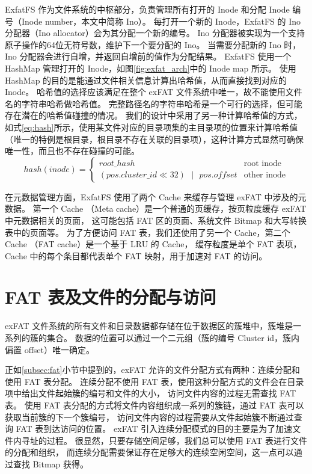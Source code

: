 ExfatFS 作为文件系统的中枢部分，负责管理所有打开的 Inode 和分配 Inode 编号（Inode number，本文中简称 Ino）。
每打开一个新的 Inode，ExfatFS 的 Ino 分配器（Ino allocator）会为其分配一个新的编号。
Ino 分配器被实现为一个支持原子操作的64位无符号数，维护下一个要分配的 Ino。
当需要分配新的 Ino 时，Ino 分配器会进行自增，并返回自增前的值作为分配结果。
ExfatFS 使用一个 HashMap 管理打开的 Inode，如图\ref{fig:exfat_arch}中的 Inode map 所示。
使用 HashMap 的目的是能通过文件相关信息计算出哈希值，从而直接找到对应的 Inode。
哈希值的选择应该满足在整个 exFAT 文件系统中唯一，故不能使用文件名的字符串哈希做哈希值。
完整路径名的字符串哈希是一个可行的选择，但可能存在潜在的哈希值碰撞的情况。
我们的设计中采用了另一种计算哈希值的方式，如式\ref{eq:hash}所示，使用某文件对应的目录项集的主目录项的位置来计算哈希值
（唯一的特例是根目录，根目录不存在关联的目录项），这种计算方式显然可确保唯一性，而且也不存在碰撞的可能。
\begin{equation}\label{eq:hash}
    hash(inode) = 
    \begin{cases}
        root\_hash & \text{root inode} \\
        (pos.cluster\_id \ll 32) \text{ }|\text{ } pos.offset & \text{other inode}
    \end{cases}
\end{equation}

在元数据管理方面，ExfatFS 使用了两个 Cache 来缓存与管理 exFAT 中涉及的元数据。
第一个 Cache （Meta cache）是一个普通的页缓存，按页粒度缓存 exFAT 中元数据相关的页面，
这可能包括 FAT 区的页面、系统文件 Bitmap 和大写转换表中的页面等。
为了方便访问 FAT 表，我们还使用了另一个 Cache，第二个 Cache （FAT cache）是一个基于 LRU 的 Cache，
缓存粒度是单个 FAT 表项，Cache 中的每个条目都代表单个 FAT 映射，用于加速对 FAT 的访问。

\section{FAT 表及文件的分配与访问}\label{sec:FAT}
exFAT 文件系统的所有文件和目录数据都存储在位于数据区的簇堆中，簇堆是一系列的簇的集合。
数据的位置可以通过一个二元组（簇的编号 Cluster id，簇内偏置 offset）唯一确定。

正如\ref{subsec:fat}小节中提到的，exFAT 允许的文件分配方式有两种：连续分配和使用 FAT 表分配。
连续分配不使用 FAT 表，使用这种分配方式的文件会在目录项中给出文件起始簇的编号和文件的大小，
访问文件内容的过程无需查找 FAT 表。
使用 FAT 表分配的方式将文件内容组织成一系列的簇链，通过 FAT 表可以获取当前簇的下一个簇编号，
访问文件内容的过程需要从文件起始簇不断通过查询 FAT 表到达访问的位置。
exFAT 引入连续分配模式的目的主要是为了加速文件内寻址的过程。
很显然，只要存储空间足够，我们总可以使用 FAT 表进行文件的分配和组织，
而连续分配需要保证存在足够大的连续空闲空间，这一点可以通过查找 Bitmap 获得。

